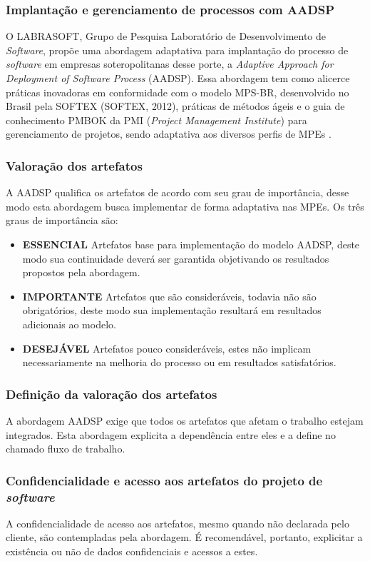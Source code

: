\documentclass{acm_proc_article-sp}
\begin{document}
\subsubsection{Implantação e gerenciamento de processos com AADSP}
O LABRASOFT, Grupo de Pesquisa Laboratório de Desenvolvimento de \textit{Software}, propõe uma abordagem adaptativa para implantação do processo de \textit{software} em empresas soteropolitanas desse porte, a \textit{Adaptive Approach for Deployment of Software Process} (AADSP). Essa abordagem tem como alicerce práticas inovadoras em conformidade com o modelo MPS-BR, desenvolvido no Brasil pela SOFTEX (SOFTEX, 2012), práticas de métodos ágeis e o guia de conhecimento PMBOK da PMI (\textit{Project Management Institute}) para gerenciamento de projetos, sendo adaptativa aos diversos perfis de MPEs \cite{aadsp:hibirdo}. 

\subsubsection*{Valoração dos artefatos}
A AADSP qualifica os artefatos de acordo com seu grau de importância, desse modo esta abordagem busca implementar de forma adaptativa nas MPEs. Os três graus de importância são:

\begin{itemize}
\item \textbf{ESSENCIAL} Artefatos base para implementação do modelo AADSP, deste modo sua continuidade deverá ser garantida objetivando os resultados propostos pela abordagem\cite{aadsp:hibirdo}.
\item \textbf{IMPORTANTE} Artefatos que são consideráveis, todavia não são obrigatórios, deste modo sua implementação resultará em resultados adicionais ao modelo\cite{aadsp:hibirdo}.
\item \textbf{DESEJÁVEL} Artefatos pouco consideráveis, estes não implicam necessariamente na melhoria do processo ou em resultados satisfatórios\cite{aadsp:hibirdo}.
\end{itemize}

\subsubsection*{Definição da valoração dos artefatos}
A abordagem AADSP  exige que todos os artefatos que afetam o trabalho estejam integrados. Esta abordagem explicita a dependência entre eles e a define no chamado fluxo de trabalho\cite{aadsp:hibirdo}.

\subsubsection*{Confidencialidade e acesso aos artefatos do projeto de \textit{software}}
A confidencialidade de acesso aos artefatos, mesmo quando não declarada pelo cliente, são contempladas pela abordagem. É recomendável, portanto, explicitar a existência ou não de dados confidenciais e acessos a estes\cite{aadsp:hibirdo}.
\end{document}
